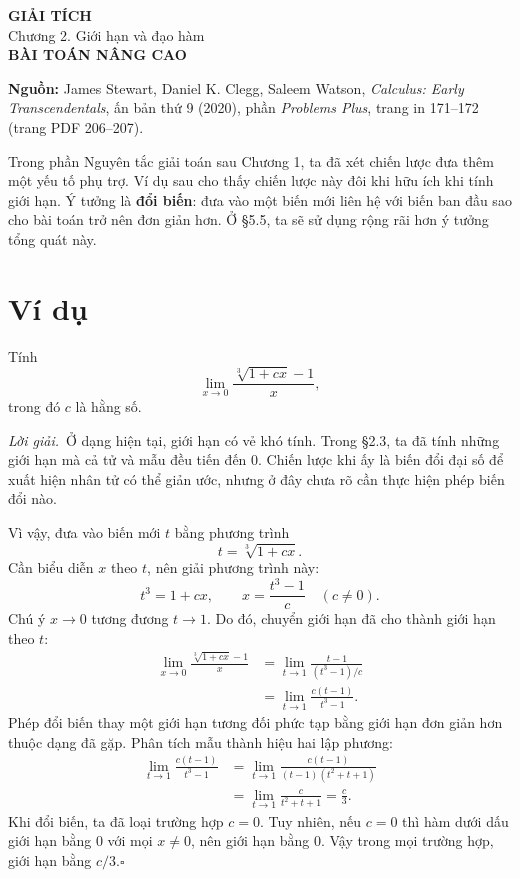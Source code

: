 \documentclass[12pt,a4paper]{article}
\newcommand{\sol}{\par\nopagebreak[4]\noindent\textit{Lời giải.}\ }
\begin{document}
\begin{center}
{\Large\bfseries GIẢI TÍCH}\\[5pt]
{\large Chương 2. Giới hạn và đạo hàm}\\[9pt]
{\Large\bfseries BÀI TOÁN NÂNG CAO}
\end{center}
\noindent\textbf{Nguồn:} James Stewart, Daniel K. Clegg, Saleem Watson, \textit{Calculus: Early Transcendentals}, ấn bản thứ 9 (2020), phần \textit{Problems Plus}, trang in 171–172 (trang PDF 206–207).

Trong phần Nguyên tắc giải toán sau Chương 1, ta đã xét chiến lược đưa thêm một yếu tố phụ trợ. Ví dụ sau cho thấy chiến lược này đôi khi hữu ích khi tính giới hạn. Ý tưởng là \textbf{đổi biến}: đưa vào một biến mới liên hệ với biến ban đầu sao cho bài toán trở nên đơn giản hơn. Ở §5.5, ta sẽ sử dụng rộng rãi hơn ý tưởng tổng quát này.
\section*{Ví dụ}
Tính
\[\lim_{x\to0}\frac{\sqrt[3]{1+cx}-1}{x},\]
trong đó $c$ là hằng số.
\sol Ở dạng hiện tại, giới hạn có vẻ khó tính. Trong §2.3, ta đã tính những giới hạn mà cả tử và mẫu đều tiến đến 0. Chiến lược khi ấy là biến đổi đại số để xuất hiện nhân tử có thể giản ước, nhưng ở đây chưa rõ cần thực hiện phép biến đổi nào.

Vì vậy, đưa vào biến mới $t$ bằng phương trình
\[t=\sqrt[3]{1+cx}.\]
Cần biểu diễn $x$ theo $t$, nên giải phương trình này:
\[t^3=1+cx,\qquad x=\frac{t^3-1}{c}\quad(c\ne0).\]
Chú ý $x\to0$ tương đương $t\to1$. Do đó, chuyển giới hạn đã cho thành giới hạn theo $t$:
\begin{align*}
\lim_{x\to0}\frac{\sqrt[3]{1+cx}-1}{x}
&=\lim_{t\to1}\frac{t-1}{(t^3-1)/c}\\
&=\lim_{t\to1}\frac{c(t-1)}{t^3-1}.
\end{align*}
Phép đổi biến thay một giới hạn tương đối phức tạp bằng giới hạn đơn giản hơn thuộc dạng đã gặp. Phân tích mẫu thành hiệu hai lập phương:
\begin{align*}
\lim_{t\to1}\frac{c(t-1)}{t^3-1}
&=\lim_{t\to1}\frac{c(t-1)}{(t-1)(t^2+t+1)}\\
&=\lim_{t\to1}\frac{c}{t^2+t+1}=\frac c3.
\end{align*}
Khi đổi biến, ta đã loại trường hợp $c=0$. Tuy nhiên, nếu $c=0$ thì hàm dưới dấu giới hạn bằng 0 với mọi $x\ne0$, nên giới hạn bằng 0. Vậy trong mọi trường hợp, giới hạn bằng $c/3$.\hfill$\square$
\end{document}
